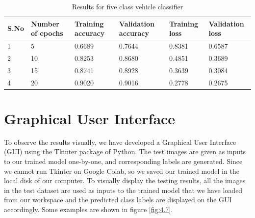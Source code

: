 \begin{table}[H]
    \caption{Results for five class vehicle classifier}
    \label{table:4.2}
      \begin{center}
        \scalebox{0.85}
        {\begin{tabular}{|l |l |l |l |l |l |}
        \hline
        S.No & Number of epochs & Training accuracy & Validation accuracy & Training loss & Validation loss\\ \hline
        1  & 5 & 0.6689 & 0.7644 & 0.8381 & 0.6587
        \\ \hline
        2  & 10 & 0.8253 & 0.8680 & 0.4851 & 0.3689
        \\ \hline %
        3   & 15 &  0.8741 & 0.8928  &0.3639  & 0.3084
        \\ \hline %
        4   & 20 &  0.9020 & 0.9016  &0.2778  & 0.2675
        \\ \hline %
        \end{tabular}}
      \end{center}
\end{table}

\section{Graphical User Interface}
To observe the results visually, we have developed a Graphical User
Interface (GUI) using the Tkinter package of 
Python. The test images are given as inputs to our trained
model one-by-one, and corresponding labels are generated.
Since we cannot run Tkinter on Google Colab,
so we saved our trained model in the local disk of our computer.
To visually display the testing results, all the images in the test dataset are used as inputs to the trained model that we have loaded  from our workspace
and the predicted class labels are displayed on the GUI accordingly.
Some examples are shown in
figure \ref{fig:4.7}.

